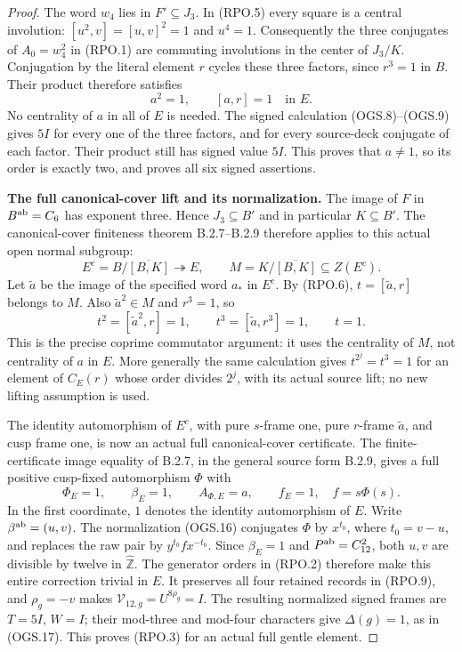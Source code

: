 \begin{proof}
The word $w_4$ lies in $F'\subseteq J_3$.
In (RPO.5) every square is a central involution:
$[u^2,v]=[u,v]^2=1$ and $u^4=1$.
Consequently the three conjugates of $A_0=w_4^2$
in (RPO.1) are commuting involutions in the
center of $J_3/K$.
Conjugation by the literal element $r$ cycles
these three factors, since $r^3=1$ in $B$.
Their product therefore satisfies
\[
                 a^2=1,\qquad [a,r]=1\quad\text{in }E.
                                                               \tag{RPO.6}
\]
No centrality of $a$ in all of $E$ is needed.
The signed calculation (OGS.8)--(OGS.9) gives
$5I$ for every one of the three factors, and
for every source-deck conjugate of each factor.
Their product still has signed value $5I$.
This proves that $a\ne1$, so its order is exactly
two, and proves all six signed assertions.

\par\medskip\noindent\textbf{The full canonical-cover lift and its normalization.}\quad
The image of $F$ in $B^{\rm ab}=C_6$ has
exponent three.  Hence $J_3\subseteq B'$ and
in particular $K\subseteq B'$.
The canonical-cover finiteness theorem B.2.7--B.2.9
therefore applies to this actual open normal
subgroup:
\[
 E^c=B/\overline{[B,K]}\twoheadrightarrow E,
 \qquad M=K/\overline{[B,K]}\subseteq Z(E^c).
                                                               \tag{RPO.7}
\]
Let $\widetilde a$ be the image of the specified
word $a_*$ in $E^c$.
By (RPO.6), $t=[\widetilde a,r]$ belongs to $M$.
Also $\widetilde a^2\in M$ and $r^3=1$, so
\[
       t^2=[\widetilde a^2,r]=1,
       \qquad t^3=[\widetilde a,r^3]=1,
       \qquad t=1.
                                                               \tag{RPO.8}
\]
This is the precise coprime commutator argument:
it uses the centrality of $M$, not centrality
of $a$ in $E$.
More generally the same calculation gives
$t^{2^j}=t^3=1$ for an element of $C_E(r)$
whose order divides $2^j$, with its actual
source lift; no new lifting assumption is used.

The identity automorphism of $E^c$, with pure
$s$-frame one, pure $r$-frame $\widetilde a$,
and cusp frame one, is now an actual full
canonical-cover certificate.
The finite-certificate image equality of B.2.7,
in the general source form B.2.9, gives a full
positive cusp-fixed automorphism $\Phi$ with
\[
       \Phi_E=1,\qquad \beta_E=1,\qquad A_{\Phi,E}=a,
       \qquad f_E=1,
       \quad f=s\Phi(s).
                                                               \tag{RPO.9}
\]
In the first coordinate, $1$ denotes the identity
automorphism of $E$.
Write $\beta^{\rm ab}=(u,v)$.
The normalization (OGS.16) conjugates $\Phi$
by $x^{t_0}$, where $t_0=v-u$, and replaces
the raw pair by $y^{t_0}fx^{-t_0}$.
Since $\beta_E=1$ and $P^{\rm ab}=C_{12}^2$,
both $u,v$ are divisible by twelve in
$\widehat{\mathbb Z}$.
The generator orders in (RPO.2) therefore make
this entire correction trivial in $E$.
It preserves all four retained records in
(RPO.9), and $\rho_g=-v$ makes
$\mathcal V_{12,g}=U^{8\rho_g}=I$.
The resulting normalized signed frames are
$T=5I$, $W=I$; their mod-three and mod-four
characters give $\Delta(g)=1$, as in (OGS.17).
This proves (RPO.3) for an actual full gentle
element.


\end{proof}
